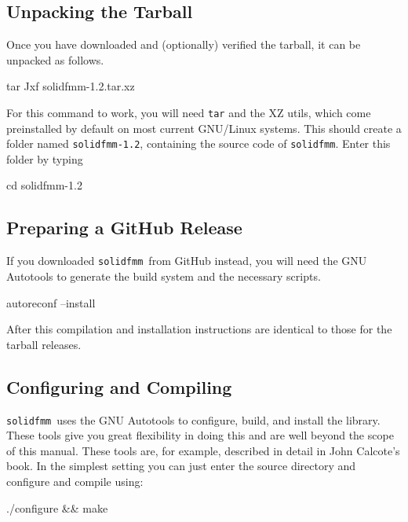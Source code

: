 \documentclass{scrbook}
\newcommand{\solidfmm}{\texttt{solidfmm}}
\begin{document}
\subsection{Unpacking the Tarball}
Once you have downloaded and (optionally) verified the tarball, it can be
unpacked as follows.
\begin{commandshell*}
tar Jxf solidfmm-1.2.tar.xz
\end{commandshell*}
For this command to work, you will need \lstinline|tar|\autocite{gnutar} and the
XZ utils\autocite{xzutils}, which come preinstalled by default on most current
GNU/Linux systems. This should create a folder named \lstinline|solidfmm-1.2|,
containing the source code of \solidfmm. Enter this folder by typing
\begin{commandshell*}
cd solidfmm-1.2
\end{commandshell*}

\subsection{Preparing a GitHub Release}
If you downloaded \solidfmm\ from GitHub instead, you will need the GNU
Autotools to generate the build system and the necessary scripts.
\begin{commandshell*}
autoreconf --install
\end{commandshell*}
After this compilation and installation instructions are identical to those
for the tarball releases.

\subsection{Configuring and Compiling}
\solidfmm\ uses the GNU Autotools to configure, build, and install the library.
These tools give you great flexibility in doing this and are well beyond the
scope of this manual. These tools are, for example, described in detail in John
Calcote's book\autocite{calcote2010}. In the simplest setting you can just
enter the source directory and configure and compile using:
\begin{commandshell*}
./configure && make
\end{commandshell*}
\end{document}
